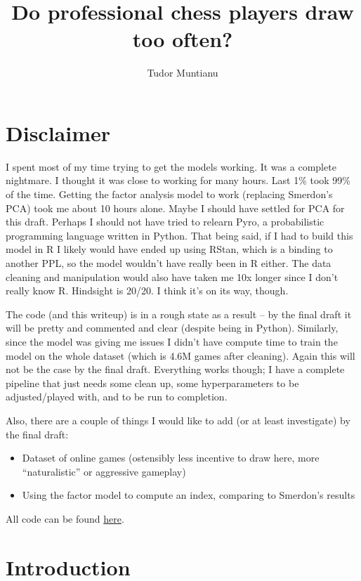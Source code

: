 \documentclass{article}
\begin{document}
\title{Do professional chess players draw too often?}
\author{Tudor Muntianu}
\maketitle

\section*{Disclaimer}
I spent most of my time trying to get the models working. It was a complete nightmare. I thought it was close to working for many hours. Last 1\% took 99\% of the time.
Getting the factor analysis model to work (replacing Smerdon's PCA) took me about 10 hours alone.
Maybe I should have settled for PCA for this draft.
Perhaps I should not have tried to relearn Pyro, a probabilistic programming language written in Python.
That being said, if I had to build this model in R I likely would have ended up using RStan, which is a binding to another PPL, so the model wouldn't have really been in R either.
The data cleaning and manipulation would also have taken me 10x longer since I don't really know R.
Hindsight is 20/20. I think it's on its way, though.

The code (and this writeup) is in a rough state as a result -- by the final draft it will be pretty and commented and clear (despite being in Python).
Similarly, since the model was giving me issues I didn't have compute time to train the model on the whole dataset (which is 4.6M games after cleaning).
Again this will not be the case by the final draft. Everything works though; I have a complete pipeline
that just needs some clean up, some hyperparameters to be adjusted/played with, and to be run to completion.

Also, there are a couple of things I would like to add (or at least investigate) by the final draft:
\begin{itemize}
    \item Dataset of online games (ostensibly less incentive to draw here, more ``naturalistic'' or aggressive gameplay)
    \item Using the factor model to compute an index, comparing to Smerdon's results
\end{itemize}

All code can be found \href{https://github.com/tmuntianu/chessdraws}{here}.

\section{Introduction}
\end{document}
